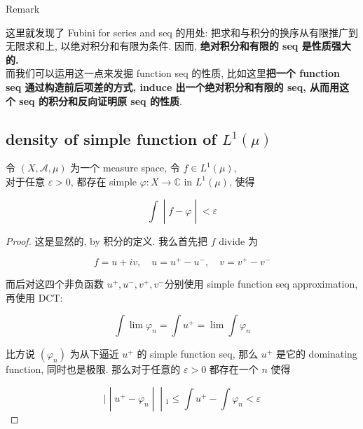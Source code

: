 \begin{qlremark}{Remark}

这里就发现了 Fubini for series and seq 的用处: 把求和与积分的换序从有限推广到无限求和上, 以绝对积分和有限为条件. 因而, \textbf{绝对积分和有限的 seq 是性质强大的.}\\
而我们可以运用这一点来发掘 function seq 的性质, 比如这里\textbf{把一个 function seq 通过构造前后项差的方式, induce 出一个绝对积分和有限的 seq, 从而用这个 seq 的积分和反向证明原 seq 的性质}.

\end{qlremark}

\subsection{\texorpdfstring{density of simple function of \(L^{1}(\mu)\)}{density of simple function of L\^{}\{1\}(\textbackslash mu)}}\label{density-of-simple-function-of-l1mu}

\begin{theorem}{}

令 \((X,\mathcal{A},\mu)\) 为一个 measure space, 令 \(f \in L^{1}(\mu)\),\\
对于任意 \(\varepsilon > 0\), 都存在 simple \(\varphi:X\rightarrow\mathbb{C}\) in \(L^{1}(\mu)\), 使得

\[\left. \int \middle| f - \varphi \middle| < \varepsilon \right.\]

\end{theorem}

\begin{proof}

这是显然的, by 积分的定义. 我么首先把 \(f\) divide 为

\[f = u + iv,\quad u = u^{+} - u^{-},\quad v = v^{+} - v^{-}\]

而后对这四个非负函数 \(u^{+},u^{-},v^{+},v^{-}\)分别使用 simple function seq approximation, 再使用 DCT:

\[\int\lim\varphi_{n} = \int u^{+} = \lim\int\varphi_{n}\]

比方说 \((\varphi_{n})\) 为从下逼近 \(u^{+}\) 的 simple function seq, 那么 \(u^{+}\) 是它的 dominating function, 同时也是极限. 那么对于任意的 \(\varepsilon > 0\) 都存在一个 \(n\) 使得

\[\left. | \middle| u^{+} - \varphi_{n} \middle| \middle| {}_{1} \leq \int u^{+} - \int\varphi_{n} < \varepsilon \right.\]

\end{proof}

